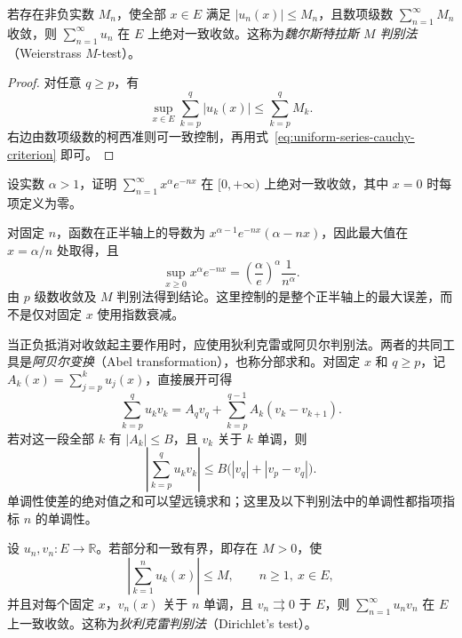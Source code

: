 \documentclass[UTF8,12pt,a4paper,fontset=fandol]{ctexbook}
\begin{document}
\begin{theorem}
\label{thm:weierstrass-uniform-m-test}
若存在非负实数 $M_n$，使全部 $x\in E$ 满足 $|u_n(x)|\leq M_n$，且数项级数 $\sum_{n=1}^\infty M_n$ 收敛，则 $\sum_{n=1}^\infty u_n$ 在 $E$ 上绝对一致收敛。这称为\emph{魏尔斯特拉斯 $M$ 判别法}（Weierstrass $M$-test）。
\end{theorem}

\begin{proof}
对任意 $q\geq p$，有
\[
    \sup_{x\in E}\sum_{k=p}^q|u_k(x)|\leq\sum_{k=p}^qM_k.
\]
右边由数项级数的柯西准则可一致控制，再用式~\eqref{eq:uniform-series-cauchy-criterion} 即可。
\end{proof}

\begin{example}
\label{ex:uniform-exponential-function-series}
设实数 $\alpha>1$，证明 $\sum_{n=1}^\infty x^\alpha e^{-nx}$ 在 $[0,+\infty)$ 上绝对一致收敛，其中 $x=0$ 时每项定义为零。
\end{example}

\begin{solve}
对固定 $n$，函数在正半轴上的导数为 $x^{\alpha-1}e^{-nx}(\alpha-nx)$，因此最大值在 $x=\alpha/n$ 处取得，且
\[
    \sup_{x\geq0}x^\alpha e^{-nx}
    =\left(\frac\alpha e\right)^\alpha\frac1{n^\alpha}.
\]
由 $p$ 级数收敛及 $M$ 判别法得到结论。这里控制的是整个正半轴上的最大误差，而不是仅对固定 $x$ 使用指数衰减。
\end{solve}

当正负抵消对收敛起主要作用时，应使用狄利克雷或阿贝尔判别法。两者的共同工具是\emph{阿贝尔变换}（Abel transformation），也称分部求和。对固定 $x$ 和 $q\geq p$，记 $A_k(x)=\sum_{j=p}^ku_j(x)$，直接展开可得
\begin{equation}
    \sum_{k=p}^qu_kv_k
    =A_qv_q+\sum_{k=p}^{q-1}A_k(v_k-v_{k+1}).
    \label{eq:uniform-abel-summation}
\end{equation}
若对这一段全部 $k$ 有 $|A_k|\leq B$，且 $v_k$ 关于 $k$ 单调，则
\begin{equation}
    \left|\sum_{k=p}^qu_kv_k\right|
    \leq B\bigl(|v_q|+|v_p-v_q|\bigr).
    \label{eq:uniform-abel-summation-bound}
\end{equation}
单调性使差的绝对值之和可以望远镜求和；这里及以下判别法中的单调性都指项指标 $n$ 的单调性。

\begin{theorem}[狄利克雷判别法]
\label{thm:uniform-dirichlet-test}
设 $u_n,v_n:E\to\mathbb R$。若部分和一致有界，即存在 $M>0$，使
\[
    \left|\sum_{k=1}^nu_k(x)\right|\leq M,
    \qquad n\geq1,\ x\in E,
\]
并且对每个固定 $x$，$v_n(x)$ 关于 $n$ 单调，且 $v_n\rightrightarrows0$ 于 $E$，则 $\sum_{n=1}^\infty u_nv_n$ 在 $E$ 上一致收敛。这称为\emph{狄利克雷判别法}（Dirichlet's test）。
\end{theorem}
\end{document}
